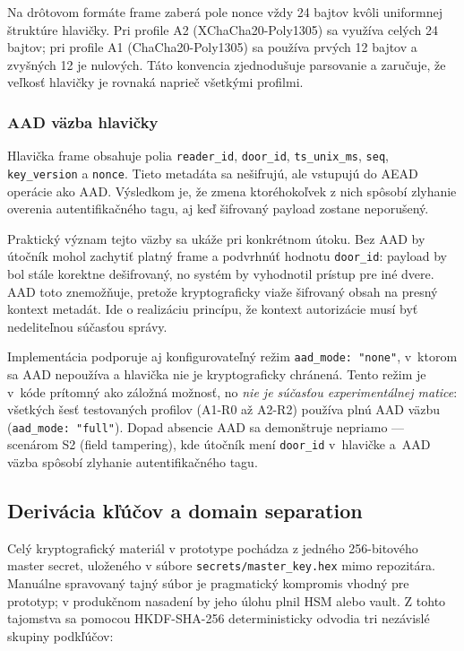 \documentclass[journal,a4paper,onecolumn]{IEEEtran}
\begin{document}
Na drôtovom formáte frame zaberá pole nonce vždy 24 bajtov kvôli uniformnej štruktúre hlavičky. Pri profile A2 (XChaCha20-Poly1305) sa využíva celých 24 bajtov; pri profile A1 (ChaCha20-Poly1305) sa používa prvých 12 bajtov a zvyšných 12 je nulových. Táto konvencia zjednodušuje parsovanie a zaručuje, že veľkosť hlavičky je rovnaká naprieč všetkými profilmi.

\subsubsection{AAD väzba hlavičky}

Hlavička frame obsahuje polia \texttt{reader\_id}, \texttt{door\_id}, \texttt{ts\_unix\_ms}, \texttt{seq}, \texttt{key\_version} a \texttt{nonce}. Tieto metadáta sa nešifrujú, ale vstupujú do AEAD operácie ako AAD. Výsledkom je, že zmena ktoréhokoľvek z nich spôsobí zlyhanie overenia autentifikačného tagu, aj keď šifrovaný payload zostane neporušený\cite{RFC5116}.

Praktický význam tejto väzby sa ukáže pri konkrétnom útoku. Bez AAD by útočník mohol zachytiť platný frame a podvrhnúť hodnotu \texttt{door\_id}: payload by bol stále korektne dešifrovaný, no systém by vyhodnotil prístup pre iné dvere. AAD toto znemožňuje, pretože kryptograficky viaže šifrovaný obsah na presný kontext metadát. Ide o realizáciu princípu, že kontext autorizácie musí byť nedeliteľnou súčasťou správy.

Implementácia podporuje aj konfigurovateľný režim \texttt{aad\_mode: "none"}, v~ktorom sa AAD nepoužíva a hlavička nie je kryptograficky chránená. Tento režim je v~kóde prítomný ako záložná možnosť, no \emph{nie je súčasťou experimentálnej matice}: všetkých šesť testovaných profilov (A1-R0 až A2-R2) používa plnú AAD väzbu (\texttt{aad\_mode: "full"}). Dopad absencie AAD sa demonštruje nepriamo --- scenárom S2 (field tampering), kde útočník mení \texttt{door\_id} v~hlavičke a~AAD väzba spôsobí zlyhanie autentifikačného tagu.

\subsection{Derivácia kľúčov a domain separation}

Celý kryptografický materiál v prototype pochádza z jedného 256-bitového master secret, uloženého v súbore \texttt{secrets/master\_key.hex} mimo repozitára. Manuálne spravovaný tajný súbor je pragmatický kompromis vhodný pre prototyp; v produkčnom nasadení by jeho úlohu plnil HSM alebo vault\cite{NIST80057}. Z tohto tajomstva sa pomocou HKDF-SHA-256\cite{RFC5869} deterministicky odvodia tri nezávislé skupiny podkľúčov:
\end{document}
